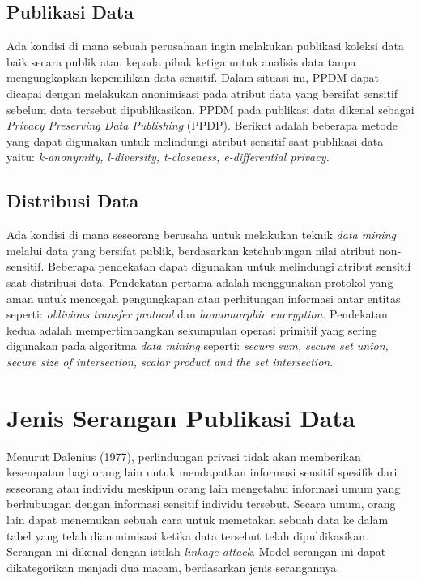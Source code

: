 \subsection{Publikasi Data} 
Ada kondisi di mana sebuah perusahaan ingin melakukan publikasi koleksi data baik secara publik atau kepada pihak ketiga untuk analisis data tanpa mengungkapkan kepemilikan data sensitif. Dalam situasi ini, PPDM dapat dicapai dengan melakukan anonimisasi pada atribut data yang bersifat sensitif sebelum data tersebut dipublikasikan. PPDM pada publikasi data dikenal sebagai \textit{Privacy Preserving Data Publishing} (PPDP). Berikut adalah beberapa metode yang dapat digunakan untuk melindungi atribut sensitif saat publikasi data yaitu: \textit{k-anonymity, l-diversity, t-closeness, e-differential privacy.}

\subsection{Distribusi Data} 
Ada kondisi di mana seseorang berusaha untuk melakukan teknik \textit{data mining} melalui data yang bersifat publik, berdasarkan ketehubungan nilai atribut non-sensitif. Beberapa pendekatan dapat digunakan untuk melindungi atribut sensitif saat distribusi data. Pendekatan pertama adalah menggunakan protokol yang aman untuk mencegah pengungkapan atau perhitungan informasi antar entitas seperti: \textit{oblivious transfer protocol} dan \textit{homomorphic encryption}. Pendekatan kedua adalah mempertimbangkan sekumpulan operasi primitif yang sering digunakan pada algoritma \textit{data mining} seperti: \textit{secure sum, secure set union, secure size of intersection, scalar product and the set intersection}.

\section{Jenis Serangan Publikasi Data} 
Menurut Dalenius (1977), perlindungan privasi tidak akan memberikan kesempatan bagi orang lain untuk mendapatkan informasi sensitif spesifik dari seseorang atau individu meskipun orang lain mengetahui informasi umum yang berhubungan dengan informasi sensitif individu tersebut. Secara umum, orang lain dapat menemukan sebuah cara untuk memetakan sebuah data ke dalam tabel yang telah dianonimisasi ketika data tersebut telah dipublikasikan. Serangan ini dikenal dengan istilah \textit{linkage attack}. Model serangan ini dapat dikategorikan menjadi dua macam, berdasarkan jenis serangannya.

